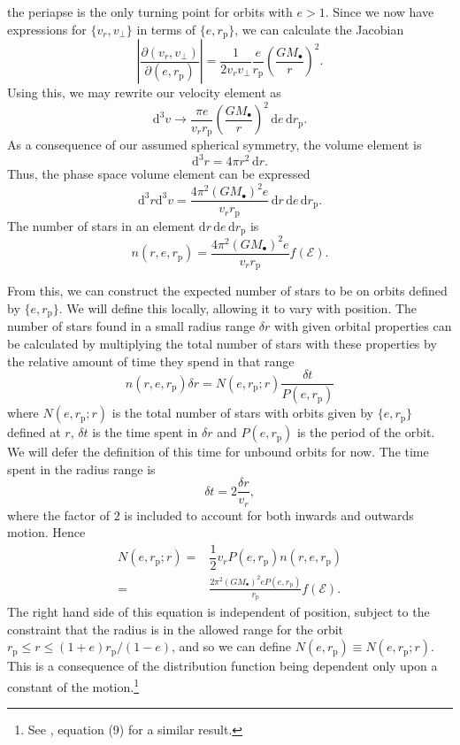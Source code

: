 \documentclass[useAMS,usedcolumn,usegraphicx,usenatbib]{mn2e}
\newcommand{\sub}[1]{\ensuremath{_\mathrm{#1}}}
\newcommand{\dd}{\ensuremath{\mathrm{d}}}
\newcommand{\recip}[1]{\ensuremath{\dfrac{1}{#1}}}
\begin{document}
the periapse is the only turning point for orbits with $e > 1$. Since we now have expressions for $\{v_r, v_\perp\}$ in terms of $\{e, r\sub{p}\}$, we can calculate the Jacobian
\begin{equation}
\left|\frac{\partial(v_r, v_\perp)}{\partial(e, r\sub{p})}\right| = \recip{2v_rv_\perp}\frac{e}{r\sub{p}}\left(\frac{GM_\bullet}{r}\right)^2.
\end{equation}
Using this, we may rewrite our velocity element as
\begin{equation}
\dd^3v \rightarrow \frac{\pi e}{v_rr\sub{p}}\left(\frac{GM_\bullet}{r}\right)^2\,\dd e \,\dd r\sub{p}.
\end{equation}
As a consequence of our assumed spherical symmetry, the volume element is
\begin{equation}
\dd^3r = 4\pi r^2 \,\dd r.
\end{equation}
Thus, the phase space volume element can be expressed
\begin{equation}
\dd^3r\dd^3v = \frac{4\pi^2(GM_\bullet)^2e}{v_rr\sub{p}}\,\dd r\,\dd e \,\dd r\sub{p}.
\end{equation}
The number of stars in an element $\dd r\,\dd e\,\dd r\sub{p}$ is
\begin{equation}
n(r, e, r\sub{p}) = \frac{4\pi^2(GM_\bullet)^2e}{v_rr\sub{p}}f(\mathcal{E}).
\end{equation}

From this, we can construct the expected number of stars to be on orbits defined by $\{e, r\sub{p}\}$. We will define this locally, allowing it to vary with position. The number of stars found in a small radius range $\delta r$ with given orbital properties can be calculated by multiplying the total number of stars with these properties by the relative amount of time they spend in that range
\begin{equation}
n(r, e, r\sub{p})\delta r = N(e, r\sub{p}; r)\frac{\delta t}{P(e, r\sub{p})}
\end{equation}
where $N(e, r\sub{p}; r)$ is the total number of stars with orbits given by $\{e, r\sub{p}\}$ defined at $r$, $\delta t$ is the time spent in $\delta r$ and $P(e, r\sub{p})$ is the period of the orbit. We will defer the definition of this time for unbound orbits for now. The time spent in the radius range is
\begin{equation}
\delta t = 2\frac{\delta r}{v_r},
\end{equation}
where the factor of $2$ is included to account for both inwards and outwards motion. Hence
\begin{align}
N(e, r\sub{p}; r) = {} & \recip{2} v_r P(e, r\sub{p}) n(r, e, r\sub{p})\\
 = {} & \frac{2\pi^2(GM_\bullet)^2 e P(e, r\sub{p})}{r\sub{p}}f(\mathcal{E}).
\end{align}
The right hand side of this equation is independent of position, subject to the constraint that the radius is in the allowed range for the orbit $r\sub{p} \leq r \leq (1+e)r\sub{p}/(1-e)$, and so we can define $N(e, r\sub{p}) \equiv N(e, r\sub{p}; r)$. This is a consequence of the distribution function being dependent only upon a constant of the motion.\footnote{See \citet{Bahcall1976}, equation (9) for a similar result.}
\end{document}
